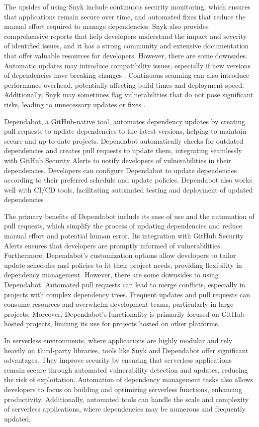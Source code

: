 \documentclass[sigconf]{acmart}
\begin{document}
The upsides of using Snyk include continuous security monitoring, which ensures that applications remain secure over time, and automated fixes that reduce the manual effort required to manage dependencies. Snyk also provides comprehensive reports that help developers understand the impact and severity of identified issues, and it has a strong community and extensive documentation that offer valuable resources for developers. However, there are some downsides. Automatic updates may introduce compatibility issues, especially if new versions of dependencies have breaking changes \cite{benischke2023updates}. Continuous scanning can also introduce performance overhead, potentially affecting build times and deployment speed. Additionally, Snyk may sometimes flag vulnerabilities that do not pose significant risks, leading to unnecessary updates or fixes \cite{snykFalsePositives2023}.

Dependabot, a GitHub-native tool, automates dependency updates by creating pull requests to update dependencies to the latest versions, helping to maintain secure and up-to-date projects. Dependabot automatically checks for outdated dependencies and creates pull requests to update them, integrating seamlessly with GitHub Security Alerts to notify developers of vulnerabilities in their dependencies. Developers can configure Dependabot to update dependencies according to their preferred schedule and update policies. Dependabot also works well with CI/CD tools, facilitating automated testing and deployment of updated dependencies \cite{dependabot2023}.

The primary benefits of Dependabot include its ease of use and the automation of pull requests, which simplify the process of updating dependencies and reduce manual effort and potential human error. Its integration with GitHub Security Alerts ensures that developers are promptly informed of vulnerabilities. Furthermore, Dependabot's customization options allow developers to tailor update schedules and policies to fit their project needs, providing flexibility in dependency management. However, there are some downsides to using Dependabot. Automated pull requests can lead to merge conflicts, especially in projects with complex dependency trees. Frequent updates and pull requests can consume resources and overwhelm development teams, particularly in large projects. Moreover, Dependabot's functionality is primarily focused on GitHub-hosted projects, limiting its use for projects hosted on other platforms.

In serverless environments, where applications are highly modular and rely heavily on third-party libraries, tools like Snyk and Dependabot offer significant advantages. They improve security by ensuring that serverless applications remain secure through automated vulnerability detection and updates, reducing the risk of exploitation. Automation of dependency management tasks also allows developers to focus on building and optimizing serverless functions, enhancing productivity. Additionally, automated tools can handle the scale and complexity of serverless applications, where dependencies may be numerous and frequently updated.
\end{document}
